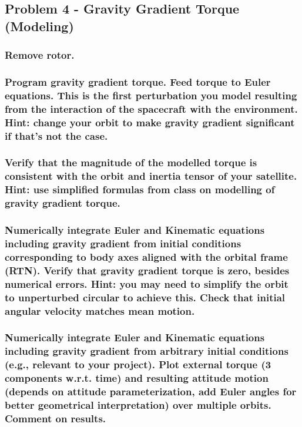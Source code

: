 \subsection{Problem 4 - Gravity Gradient Torque (Modeling)}

\subsubsection{Remove rotor.}

\subsubsection{Program gravity gradient torque. Feed torque to Euler equations. This is the first perturbation you
model resulting from the interaction of the spacecraft with the environment. Hint: change your orbit
to make gravity gradient significant if that’s not the case.}

\subsubsection{Verify that the magnitude of the modelled torque is consistent with the orbit and inertia tensor of
your satellite. Hint: use simplified formulas from class on modelling of gravity gradient torque.}

\subsubsection{Numerically integrate Euler and Kinematic equations including gravity gradient from initial
conditions corresponding to body axes aligned with the orbital frame (RTN). Verify that gravity
gradient torque is zero, besides numerical errors. Hint: you may need to simplify the orbit to
unperturbed circular to achieve this. Check that initial angular velocity matches mean motion.}

\subsubsection{Numerically integrate Euler and Kinematic equations including gravity gradient from arbitrary
initial conditions (e.g., relevant to your project). Plot external torque (3 components w.r.t. time)
and resulting attitude motion (depends on attitude parameterization, add Euler angles for better
geometrical interpretation) over multiple orbits. Comment on results.}


